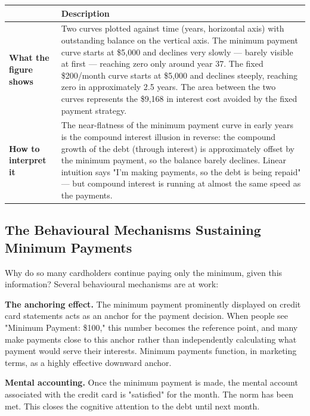 \documentclass[12pt, letterpaper]{article}
\begin{document}
\begin{table}[H]
\centering
\small
\begin{tabularx}{\linewidth}{lY}
\toprule
 & Description \\
\midrule
\textbf{What the figure shows} & Two curves plotted against time (years, horizontal axis) with outstanding balance on the vertical axis. The minimum payment curve starts at \$5,000 and declines very slowly --- barely visible at first --- reaching zero only around year 37. The fixed \$200/month curve starts at \$5,000 and declines steeply, reaching zero in approximately 2.5 years. The area between the two curves represents the \$9,168 in interest cost avoided by the fixed payment strategy. \\
\textbf{How to interpret it} & The near-flatness of the minimum payment curve in early years is the compound interest illusion in reverse: the compound growth of the debt (through interest) is approximately offset by the minimum payment, so the balance barely declines. Linear intuition says "I'm making payments, so the debt is being repaid" --- but compound interest is running at almost the same speed as the payments. \\
\bottomrule
\end{tabularx}
\end{table}



\subsection{The Behavioural Mechanisms Sustaining Minimum Payments}


Why do so many cardholders continue paying only the minimum, given this information? Several behavioural mechanisms are at work:

\textbf{The anchoring effect.} The minimum payment prominently displayed on credit card statements acts as an anchor for the payment decision. When people see "Minimum Payment: \$100," this number becomes the reference point, and many make payments close to this anchor rather than independently calculating what payment would serve their interests. Minimum payments function, in marketing terms, as a highly effective downward anchor.

\textbf{Mental accounting.} Once the minimum payment is made, the mental account associated with the credit card is "satisfied" for the month. The norm has been met. This closes the cognitive attention to the debt until next month.
\end{document}
